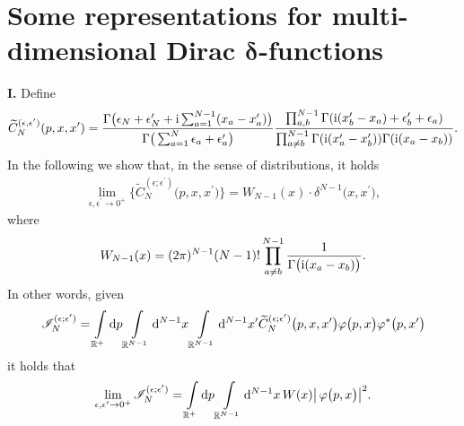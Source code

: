 \documentclass[pdftex]{sigma}%
\numberwithin{equation}{section}
\begin{document}
\appendix

\section[Some representations for multi-dimensional Dirac delta-functions]
{Some representations for multi-dimensional Dirac $\boldsymbol{\delta}$-functions}
\label{Appendix identite fct delat evoluee}

{\bf I.} Define
\begin{gather*}
\widetilde C_N^{( \epsilon, \epsilon')}(p, x, x')=
\frac{\Gamma\big(
\epsilon_N+\epsilon'_N+{\rm i}\sum_{a=1}^{N-1}(x_a-x'_a)\big)}{\Gamma\big(\sum_{a=1}^N\epsilon_a+\epsilon'_a\big) }
 \frac{ \prod_{ a, b }^{ N-1 }\Gamma({\rm i}(x'_b-x_a)+\epsilon'_b+\epsilon_a)}{ \prod_{ a \not= b }^{ N-1 }
\Gamma( {\rm i} (x_{a}^{\prime}-x_{b}^{\prime})) \Gamma( {\rm i} (x_{a}-x_{b})) }.
\end{gather*}
In the following we show that, in the sense of distributions, it holds
\begin{gather*}
\lim_{\epsilon, \epsilon^{\prime} \rightarrow 0^+ } \big\{ \widetilde{C}_N^{(\epsilon;\epsilon^{\prime})}\big(p,x,x^{\prime} \big) \big\}
= W_{N-1}(x) \cdot \delta^{N-1}\big(x,x^{\prime} \big),
\end{gather*}
where
\begin{gather}\label{W-N-def}
W_{N-1}(x) = (2\pi)^{N-1} (N-1)! \prod\limits_{a\not=b}^{N-1} \frac{1}{ \Gamma\big({\rm i} (x_{a}-x_{b}) \big) }.
\end{gather}
In other words, given
\begin{gather}
\mathscr{I}_N^{(\epsilon;\epsilon^{\prime})} = \int\limits_{\mathbb{R}^+}{} {\rm d}p \int\limits_{\mathbb{R}^{N-1}}{}
{\rm d}^{N-1}x \int\limits_{\mathbb{R}^{N-1}}{} {\rm d}^{N-1}x^{\prime}
\widetilde{C}_N^{(\epsilon;\epsilon^{\prime})}\big(p,x,x^{\prime} \big)
\varphi\big(p,x\big)\varphi^{*}\big(p,x^{\prime}\big)
\label{equation definition msc IN}
\end{gather}
it holds that
\begin{gather*}
\lim_{\epsilon, \epsilon^{\prime} \rightarrow 0^+ } \mathscr{I}_N^{(\epsilon;\epsilon^{\prime})}
=
 \int\limits_{\mathbb{R}^+}{} {\rm d}p \int\limits_{\mathbb{R}^{N-1}}{} {\rm d}^{N-1}x\, W(x) \big| \,\varphi\big(p,x\big) \big|^2 .
\end{gather*}
\end{document}

